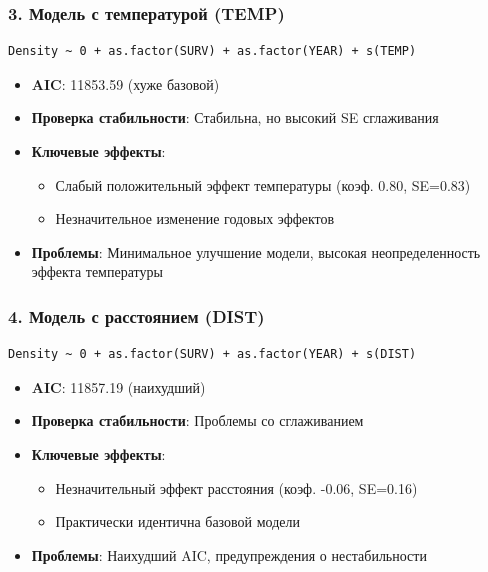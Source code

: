 \documentclass[
  letterpaper,
  DIV=11,
  numbers=noendperiod]{scrreprt}
\begin{document}
\subsubsection{\texorpdfstring{\textbf{3. Модель с температурой
(TEMP)}}{3. Модель с температурой (TEMP)}}\label{ux43cux43eux434ux435ux43bux44c-ux441-ux442ux435ux43cux43fux435ux440ux430ux442ux443ux440ux43eux439-temp}

\begin{verbatim}
Density ~ 0 + as.factor(SURV) + as.factor(YEAR) + s(TEMP)
\end{verbatim}

\begin{itemize}
\item
  \textbf{AIC}: 11853.59 (хуже базовой)
\item
  \textbf{Проверка стабильности}: Стабильна, но высокий SE сглаживания
\item
  \textbf{Ключевые эффекты}:

  \begin{itemize}
  \item
    Слабый положительный эффект температуры (коэф. 0.80, SE=0.83)
  \item
    Незначительное изменение годовых эффектов
  \end{itemize}
\item
  \textbf{Проблемы}: Минимальное улучшение модели, высокая
  неопределенность эффекта температуры
\end{itemize}

\subsubsection{\texorpdfstring{\textbf{4. Модель с расстоянием
(DIST)}}{4. Модель с расстоянием (DIST)}}\label{ux43cux43eux434ux435ux43bux44c-ux441-ux440ux430ux441ux441ux442ux43eux44fux43dux438ux435ux43c-dist}

\begin{verbatim}
Density ~ 0 + as.factor(SURV) + as.factor(YEAR) + s(DIST)
\end{verbatim}

\begin{itemize}
\item
  \textbf{AIC}: 11857.19 (наихудший)
\item
  \textbf{Проверка стабильности}: Проблемы со сглаживанием
\item
  \textbf{Ключевые эффекты}:

  \begin{itemize}
  \item
    Незначительный эффект расстояния (коэф. -0.06, SE=0.16)
  \item
    Практически идентична базовой модели
  \end{itemize}
\item
  \textbf{Проблемы}: Наихудший AIC, предупреждения о нестабильности
\end{itemize}
\end{document}
